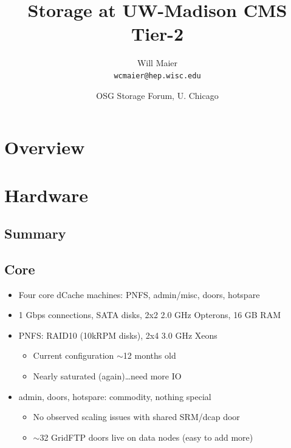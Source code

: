\documentclass{beamer}
\title{Storage at UW-Madison CMS Tier-2}
\author[Maier]{
    Will Maier \\ 
    {\tt wcmaier@hep.wisc.edu}}
\institute[Wisconsin]{University of Wisconsin - High Energy Physics}
\date[2010.09.22]{OSG Storage Forum, U. Chicago}
\newcommand{\ca}{\ensuremath{\sim}}
\begin{document}

\begin{frame}
    \titlepage
\end{frame}

\section{Overview}
\begin{frame}
    \tableofcontents
\end{frame}

\section{Hardware}
\subsection{Summary}
\subsection{Core}
\begin{frame}
\begin{itemize}
	\item Four core dCache machines: PNFS, admin/misc, doors, hotspare
	\item 1 Gbps connections, SATA disks, 2x2 2.0 GHz Opterons, 16 GB RAM
	\item PNFS: RAID10 (10kRPM disks), 2x4 3.0 GHz Xeons
	\begin{itemize}
		\item Current configuration \ca{}12 months old
		\item Nearly saturated (again)\ldots{}need more IO
	\end{itemize}
	\item admin, doors, hotspare: commodity, nothing special
	\begin{itemize}
		\item No observed scaling issues with shared SRM/dcap door
		\item \ca{}32 GridFTP doors live on data nodes (easy to add more)
	\end{itemize}
\end{itemize}
\end{frame}
\end{document}
